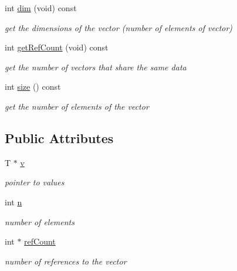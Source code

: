 \begin{DoxyCompactItemize}
\mbox{\label{class_mb_vector_aca53f44c61062378aa857e5a2a12350e}} 
int \mbox{\hyperlink{class_mb_vector_aca53f44c61062378aa857e5a2a12350e}{dim}} (void) const
\begin{DoxyCompactList}\small\item\em get the dimensions of the vector (number of elements of vector) \end{DoxyCompactList}\item 
\mbox{\label{class_mb_vector_af48cfa4fd2383bb5505f9545e60bbfa8}} 
int \mbox{\hyperlink{class_mb_vector_af48cfa4fd2383bb5505f9545e60bbfa8}{get\+Ref\+Count}} (void) const
\begin{DoxyCompactList}\small\item\em get the number of vectors that share the same data \end{DoxyCompactList}\item 
\mbox{\label{class_mb_vector_af68c1d86ed75dc29fdd7eb9070b751a3}} 
int \mbox{\hyperlink{class_mb_vector_af68c1d86ed75dc29fdd7eb9070b751a3}{size}} () const
\begin{DoxyCompactList}\small\item\em get the number of elements of the vector \end{DoxyCompactList}\end{DoxyCompactItemize}
\subsection*{Public Attributes}
\begin{DoxyCompactItemize}
\item 
\mbox{\label{class_mb_vector_ac80a49eb5c2cfc07e264f049530d14d0}} 
T $\ast$ \mbox{\hyperlink{class_mb_vector_ac80a49eb5c2cfc07e264f049530d14d0}{v}}
\begin{DoxyCompactList}\small\item\em pointer to values \end{DoxyCompactList}\item 
\mbox{\label{class_mb_vector_a190e77a423352dbfcd566ca3cfcc3ea9}} 
int \mbox{\hyperlink{class_mb_vector_a190e77a423352dbfcd566ca3cfcc3ea9}{n}}
\begin{DoxyCompactList}\small\item\em number of elements \end{DoxyCompactList}\item 
\mbox{\label{class_mb_vector_aaffe4fea3e516a528aa7f17db3424e53}} 
int $\ast$ \mbox{\hyperlink{class_mb_vector_aaffe4fea3e516a528aa7f17db3424e53}{ref\+Count}}
\begin{DoxyCompactList}\small\item\em number of references to the vector \end{DoxyCompactList}\end{DoxyCompactItemize}


